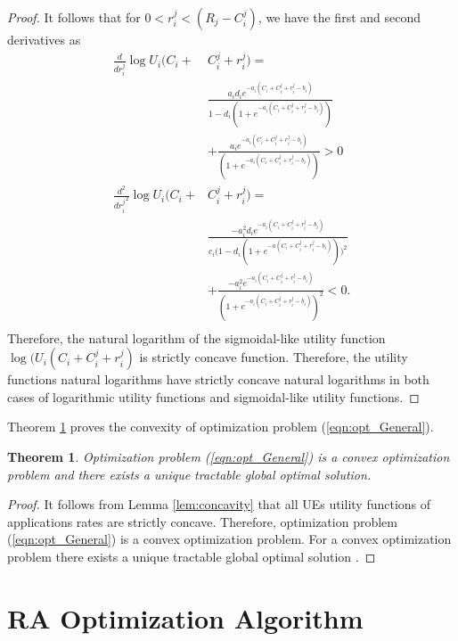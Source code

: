 \documentclass[journal]{IEEEtran} 				\IEEEoverridecommandlockouts 						\usepackage{amsmath,amssymb}
\newtheorem{thm}{Theorem}[section]
\begin{document}
\begin{proof}
It follows that for $0 < r_i^j < (R_j-C_i^j)$, we have the first and second derivatives as
\begin{align*}
\frac{d}{dr_i^j}\log U_i(C_i+&C_i^j+r_i^j) =\\
& \frac{a_id_i e^{-a_i(C_i+C_i^j+r_i^j-b_i)}}{1-d_i(1+e^{-a_i(C_i+C_i^j+r_i^j-b_i)})} \\
&  + \frac{a_ie^{-a_i(C_i+C_i^j+r_i^j-b_i)}}{(1+e^{-a_i(C_i+C_i^j+r_i^j-b_i)})}>0\\
\frac{d^2}{{dr_i^j}^2}\log U_i(C_i+&C_i^j+r_i^j) =\\
& \frac{-a_i^2d_ie^{-a_i(C_i+C_i^j+r_i^j-b_i)}}{c_i\Big(1-d_i(1+e^{-a(C_i+C_i^j+r_i^j-b_i)})\Big)^2} \\
&  + \frac{-a_i^2e^{-a_i(C_i+C_i^j+r_i^j-b_i)}}{(1+e^{-a_i(C_i+C_i^j+r_i^j-b_i)})^2} < 0.\\
\end{align*}
Therefore, the natural logarithm of the sigmoidal-like utility function $\log (U_i(C_i+C_i^j+r_i^j)$ is strictly concave function. Therefore, the utility functions natural logarithms have strictly concave natural logarithms in both cases of logarithmic utility functions and sigmoidal-like utility functions.
\end{proof}

Theorem \ref{thm:global_soln} proves the convexity of optimization problem (\ref{eqn:opt_General}).

\begin{thm}\label{thm:global_soln}
Optimization problem (\ref{eqn:opt_General}) is a convex optimization problem and there exists a unique tractable global optimal solution.
\end{thm}

\begin{proof}
It follows from Lemma \ref{lem:concavity} that all UEs utility functions of applications rates are strictly concave. Therefore, optimization problem (\ref{eqn:opt_General}) is a convex optimization problem. For a convex optimization problem there exists a unique tractable global optimal solution \cite{Boyd}.
\end{proof}

\section{RA Optimization Algorithm}\label{sec:Algorithm}
\end{document}
